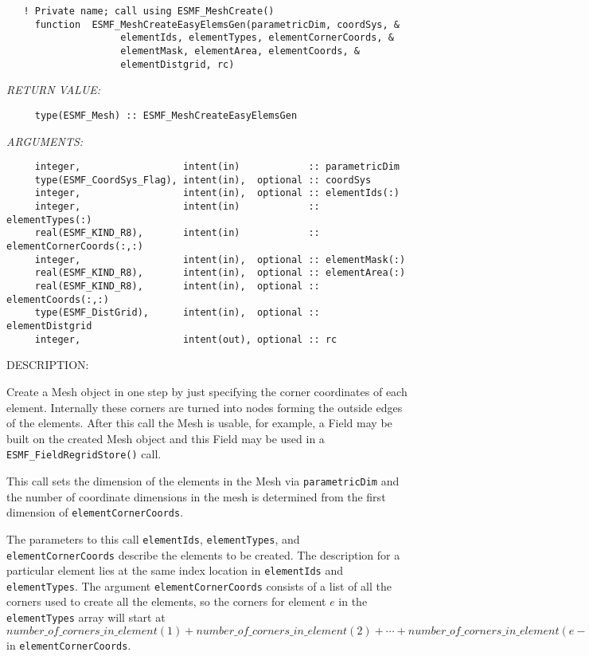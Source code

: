   
\begin{verbatim}   ! Private name; call using ESMF_MeshCreate()
     function  ESMF_MeshCreateEasyElemsGen(parametricDim, coordSys, &
                    elementIds, elementTypes, elementCornerCoords, &
                    elementMask, elementArea, elementCoords, &
                    elementDistgrid, rc)\end{verbatim}{\em RETURN VALUE:}
\begin{verbatim}     type(ESMF_Mesh) :: ESMF_MeshCreateEasyElemsGen\end{verbatim}{\em ARGUMENTS:}
\begin{verbatim}     integer,                  intent(in)            :: parametricDim
     type(ESMF_CoordSys_Flag), intent(in),  optional :: coordSys
     integer,                  intent(in),  optional :: elementIds(:)
     integer,                  intent(in)            :: elementTypes(:)
     real(ESMF_KIND_R8),       intent(in)            :: elementCornerCoords(:,:)
     integer,                  intent(in),  optional :: elementMask(:)
     real(ESMF_KIND_R8),       intent(in),  optional :: elementArea(:)
     real(ESMF_KIND_R8),       intent(in),  optional :: elementCoords(:,:)
     type(ESMF_DistGrid),      intent(in),  optional :: elementDistgrid
     integer,                  intent(out), optional :: rc\end{verbatim}
{\sf DESCRIPTION:\\ }


     Create a Mesh object in one step by just specifying the corner coordinates of each element.
     Internally these corners are turned into nodes forming the outside edges of the elements.
     After this call the Mesh is usable, for
     example, a Field may be built on the created Mesh object and
     this Field may be used in a {\tt ESMF\_FieldRegridStore()} call.
  
     This call sets the dimension of the elements in the Mesh
     via {\tt parametricDim} and the number of coordinate dimensions in the mesh
     is determined from the first dimension of {\tt elementCornerCoords}.
  
     The parameters to this call {\tt elementIds}, {\tt elementTypes}, and
     {\tt elementCornerCoords} describe the elements to be created. The description
     for a particular element lies at the same index location in {\tt elementIds}
     and {\tt elementTypes}. The argument {\tt elementCornerCoords} consists of a list of
     all the corners used to create all the elements, so the corners for element $e$ in the
     {\tt elementTypes} array will start at $number\_of\_corners\_in\_element(1)
      + number\_of\_corners\_in\_element(2) +
     \cdots + number\_of\_corners\_in\_element(e-1) + 1$ in {\tt elementCornerCoords}.
  
